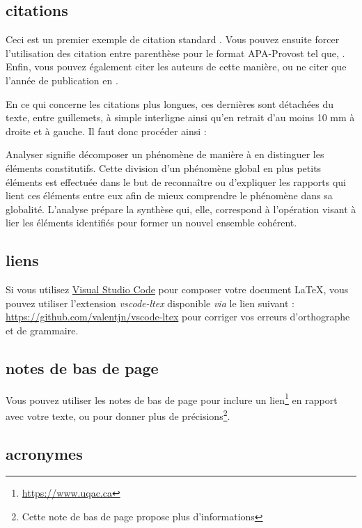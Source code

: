 \subsection{citations}

Ceci est un premier exemple de citation standard \cite{RN3}. Vous pouvez ensuite forcer l'utilisation des citation entre parenthèse pour le format APA-Provost tel que, \citep{RN4}. Enfin, vous pouvez également citer les auteurs \citet{RN5} de cette manière, ou ne citer que l'année de publication en  \citeyear{RN5}.

En ce qui concerne les citations plus longues, ces dernières sont détachées du texte, entre guillemets, à simple interligne ainsi qu’en retrait d’au moins 10 mm à droite et à gauche. Il faut donc procéder ainsi :
\begin{displayquote}
Analyser signifie décomposer un phénomène de manière à en distinguer les éléments constitutifs. Cette division d’un phénomène global en plus petits éléments est effectuée dans le but de reconnaître ou d’expliquer les rapports qui lient ces éléments entre eux afin de mieux comprendre le phénomène dans sa globalité. L’analyse prépare la synthèse qui, elle, correspond à l’opération visant à lier les éléments identifiés pour former un nouvel ensemble cohérent. \citep[p.104]{RN4}
\end{displayquote}

\subsection{liens}

Si vous utilisez \href{https://code.visualstudio.com/}{Visual Studio Code} pour composer votre document \LaTeX{}, vous pouvez utiliser l'extension \textit{vscode-ltex} disponible \textit{via} le lien suivant : \url{https://github.com/valentjn/vscode-ltex} pour corriger vos erreurs d'orthographe et de grammaire.

\subsection{notes de bas de page}

Vous pouvez utiliser les notes de bas de page pour inclure un lien\footnote{\url{https://www.uqac.ca}} en rapport avec votre texte, ou pour donner plus de précisions\footnote{Cette note de bas de page propose plus d'informations}.

\subsection{acronymes}

